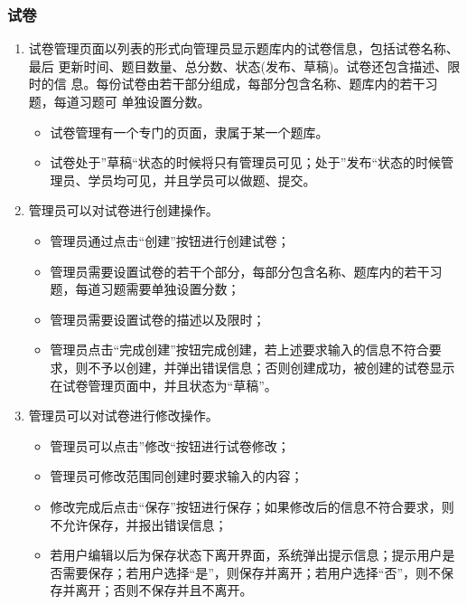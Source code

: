 \documentclass{article}
\begin{document}
    \subsubsection{试卷}
    \begin{enumerate}
        \item 试卷管理页面以列表的形式向管理员显示题库内的试卷信息，包括试卷名称、最后 更新时间、题目数量、总分数、状态(发布、草稿)。试卷还包含描述、限时的信 息。每份试卷由若干部分组成，每部分包含名称、题库内的若干习题，每道习题可 单独设置分数。
        \begin{itemize}
            \item 试卷管理有一个专门的页面，隶属于某一个题库。
            \item 试卷处于”草稿“状态的时候将只有管理员可见；处于”发布“状态的时候管理员、学员均可见，并且学员可以做题、提交。
        \end{itemize}

        \item 管理员可以对试卷进行创建操作。
        \begin{itemize}
            \item 管理员通过点击“创建”按钮进行创建试卷；
            \item 管理员需要设置试卷的若干个部分，每部分包含名称、题库内的若干习题，每道习题需要单独设置分数；
            \item 管理员需要设置试卷的描述以及限时；
            \item 管理员点击“完成创建”按钮完成创建，若上述要求输入的信息不符合要求，则不予以创建，并弹出错误信息；否则创建成功，被创建的试卷显示在试卷管理页面中，并且状态为“草稿”。
        \end{itemize}

        \item 管理员可以对试卷进行修改操作。
        \begin{itemize}
            \item 管理员可以点击”修改“按钮进行试卷修改；
            \item 管理员可修改范围同创建时要求输入的内容；
            \item 修改完成后点击“保存”按钮进行保存；如果修改后的信息不符合要求，则不允许保存，并报出错误信息；
            \item 若用户编辑以后为保存状态下离开界面，系统弹出提示信息；提示用户是否需要保存；若用户选择“是”，则保存并离开；若用户选择“否”，则不保存并离开；否则不保存并且不离开。
        \end{itemize}


\end{enumerate}
\end{document}
